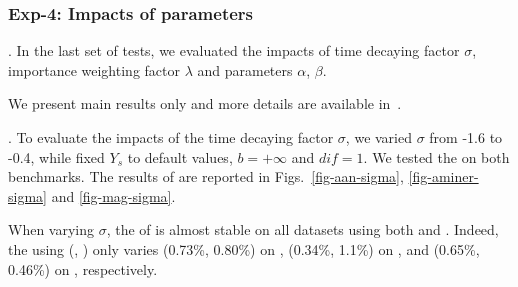 

\subsubsection{Exp-4: Impacts of parameters}.
In the last set of tests, we evaluated the impacts of time decaying factor $\sigma$, importance weighting factor $\lambda$ and parameters $\alpha$, $\beta$.

We present main results only and more details are available in~\cite{ERank-full}.




. To evaluate the impacts of the time decaying factor $\sigma$, we varied $\sigma$ from -1.6 to -0.4, while fixed $Y_s$ to default values, $b=+\infty$ and $dif=1$. We tested the \PairAcc on both benchmarks. The results of \PairAcc are reported in Figs.~\ref{fig-aan-sigma}, \ref{fig-aminer-sigma} and \ref{fig-mag-sigma}.



When varying $\sigma$, the \PairAcc of \ensemblerank is almost stable on all datasets using both \fcita and \recom. Indeed, the \PairAcc using (\fcita, \recom) only varies (0.73\%, 0.80\%) on \aan, (0.34\%, 1.1\%) on \aminer, and (0.65\%, 0.46\%) on \magdata, respectively.

